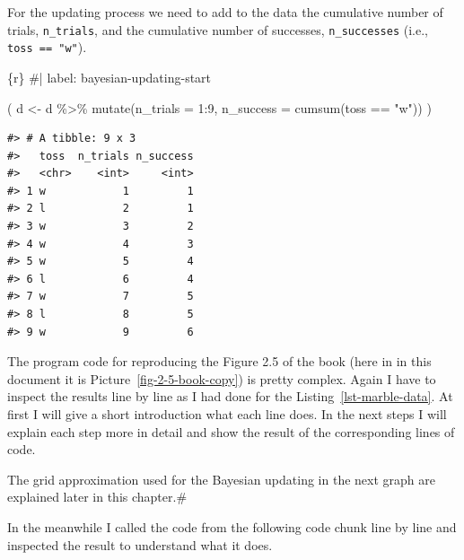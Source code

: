 \documentclass[
  letterpaper,
  DIV=11,
  numbers=noendperiod]{scrreprt}
\newenvironment{Shaded}{\begin{snugshade}}{\end{snugshade}}
\newcommand{\AttributeTok}[1]{\textcolor[rgb]{0.40,0.45,0.13}{#1}}
\newcommand{\CommentTok}[1]{\textcolor[rgb]{0.37,0.37,0.37}{#1}}
\newcommand{\DecValTok}[1]{\textcolor[rgb]{0.68,0.00,0.00}{#1}}
\newcommand{\FunctionTok}[1]{\textcolor[rgb]{0.28,0.35,0.67}{#1}}
\newcommand{\InformationTok}[1]{\textcolor[rgb]{0.37,0.37,0.37}{#1}}
\newcommand{\NormalTok}[1]{\textcolor[rgb]{0.00,0.23,0.31}{#1}}
\newcommand{\OtherTok}[1]{\textcolor[rgb]{0.00,0.23,0.31}{#1}}
\newcommand{\SpecialCharTok}[1]{\textcolor[rgb]{0.37,0.37,0.37}{#1}}
\newcommand{\StringTok}[1]{\textcolor[rgb]{0.13,0.47,0.30}{#1}}
\begin{document}
For the updating process we need to add to the data the cumulative
number of trials, \texttt{n\_trials}, and the cumulative number of
successes, \texttt{n\_successes} (i.e., \texttt{toss\ ==\ "w"}).

\begin{Shaded}
\begin{Highlighting}[]
\InformationTok{\textasciigrave{}\textasciigrave{}\textasciigrave{}\{r\}}
\CommentTok{\#| label: bayesian{-}updating{-}start}

\NormalTok{(}
\NormalTok{  d }\OtherTok{\textless{}{-}}
\NormalTok{  d }\SpecialCharTok{\%\textgreater{}\%} 
  \FunctionTok{mutate}\NormalTok{(}\AttributeTok{n\_trials  =} \DecValTok{1}\SpecialCharTok{:}\DecValTok{9}\NormalTok{,}
         \AttributeTok{n\_success =} \FunctionTok{cumsum}\NormalTok{(toss }\SpecialCharTok{==} \StringTok{"w"}\NormalTok{))}
\NormalTok{  )}
\InformationTok{\textasciigrave{}\textasciigrave{}\textasciigrave{}}
\end{Highlighting}
\end{Shaded}

\begin{verbatim}
#> # A tibble: 9 x 3
#>   toss  n_trials n_success
#>   <chr>    <int>     <int>
#> 1 w            1         1
#> 2 l            2         1
#> 3 w            3         2
#> 4 w            4         3
#> 5 w            5         4
#> 6 l            6         4
#> 7 w            7         5
#> 8 l            8         5
#> 9 w            9         6
\end{verbatim}

The program code for reproducing the Figure 2.5 of the book (here in in
this document it is Picture~\ref{fig-2-5-book-copy}) is pretty complex.
Again I have to inspect the results line by line as I had done for the
Listing~\ref{lst-marble-data}. At first I will give a short introduction
what each line does. In the next steps I will explain each step more in
detail and show the result of the corresponding lines of code.

\begin{tcolorbox}[enhanced jigsaw, colframe=quarto-callout-warning-color-frame, colback=white, toprule=.15mm, breakable, arc=.35mm, bottomtitle=1mm, colbacktitle=quarto-callout-warning-color!10!white, toptitle=1mm, titlerule=0mm, title=\textcolor{quarto-callout-warning-color}{\faExclamationTriangle}\hspace{0.5em}{Preliminary Explanation of the Next Graph}, leftrule=.75mm, opacityback=0, rightrule=.15mm, opacitybacktitle=0.6, bottomrule=.15mm, left=2mm, coltitle=black]

The grid approximation used for the Bayesian updating in the next graph
are explained later in this chapter.\#

In the meanwhile I called the code from the following code chunk line by
line and inspected the result to understand what it does.

\end{tcolorbox}
\end{document}
